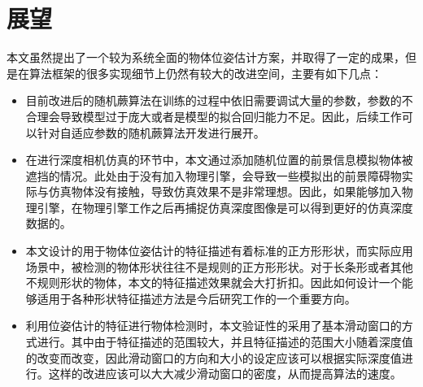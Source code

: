 \section{展望}

本文虽然提出了一个较为系统全面的物体位姿估计方案，并取得了一定的成果，但是在算法框架的很多实现细节上仍然有较大的改进空间，主要有如下几点：

\begin{itemize}
\item 目前改进后的随机蕨算法在训练的过程中依旧需要调试大量的参数，参数的不合理会导致模型过于庞大或者是模型的拟合回归能力不足。因此，后续工作可以针对自适应参数的随机蕨算法开发进行展开。

\item 在进行深度相机仿真的环节中，本文通过添加随机位置的前景信息模拟物体被遮挡的情况。此处由于没有加入物理引擎，会导致一些模拟出的前景障碍物实际与仿真物体没有接触，导致仿真效果不是非常理想。因此，如果能够加入物理引擎，在物理引擎工作之后再捕捉仿真深度图像是可以得到更好的仿真深度数据的。

\item 本文设计的用于物体位姿估计的特征描述有着标准的正方形形状，而实际应用场景中，被检测的物体形状往往不是规则的正方形形状。对于长条形或者其他不规则形状的物体，本文的特征描述效果就会大打折扣。因此如何设计一个能够适用于各种形状特征描述方法是今后研究工作的一个重要方向。

\item 利用位姿估计的特征进行物体检测时，本文验证性的采用了基本滑动窗口的方式进行。其中由于特征描述的范围较大，并且特征描述的范围大小随着深度值的改变而改变，因此滑动窗口的方向和大小的设定应该可以根据实际深度值进行。这样的改进应该可以大大减少滑动窗口的密度，从而提高算法的速度。
\end{itemize}






















